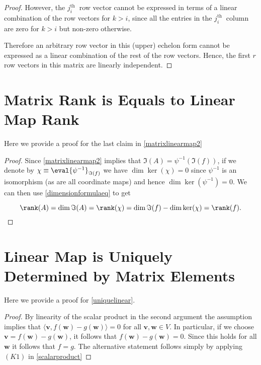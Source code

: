 \documentclass[a4paper,12pt]{report}
\begin{document}
\begin{appendices}
\begin{proof}
    However, the \(j_{i}^{\text{th }}  \) row vector cannot be expressed in terms of a linear combination of the row vectors for \(k > i \), since all the entries in the \(j_{i}^{\text{th }}  \) column are zero for \(k > i\) but non-zero otherwise. 
    
    Therefore an arbitrary row vector in this (upper) echelon form cannot be expressed as a linear combination of the rest of the row vectors. Hence, the first \(r\) row vectors in this matrix are linearly independent.         
    
\end{proof}

\section{Matrix Rank is Equals to Linear Map Rank} \label{matrixlinearmap2app} 

Here we provide a proof for the last claim in \cref{matrixlinearmap2} 

\begin{proof}
Since \cref{matrixlinearmap2} implies that \(\Im (A) = \psi ^{-1} (\Im (f))\), if we denote by \(\chi \equiv \eval{\psi  ^{-1}}_{\Im (f)}^{}  \) we have \(\dim \ker (\chi ) = 0\) since \(\psi ^{-1} \) is an isomorphism (as are all coordinate maps) and hence \(\dim \ker (\psi ^{-1} ) = 0\). We can then use \cref{dimensionformulaeq} to get

\begin{equation}
    \rank (A) = \dim \Im (A) = \rank (\chi ) = \dim \Im (f) - \dim \ker (\chi ) = \rank (f).
\end{equation}
\end{proof}

\section{Linear Map is Uniquely Determined by Matrix Elements} \label{uniquelinearapp} 

Here we provide a proof for \cref{uniquelinear}.

\begin{proof}
    By linearity of the scalar product in the second argument the assumption implies that \( \langle \mathbf{v}, f(\mathbf{w}) - g(\mathbf{w}) \rangle = 0 \) for all \( \mathbf{v}, \mathbf{w} \in V \). In particular, if we choose \( \mathbf{v} = f(\mathbf{w}) - g(\mathbf{w}) \), it follows that \( f(\mathbf{w}) - g(\mathbf{w}) = 0 \). Since this holds for all \( \mathbf{w} \) it follows that \( f = g \). The alternative statement follows simply by applying \((K1)\) in \cref{scalarproduct}
\end{proof}


\end{appendices}
\end{document}
